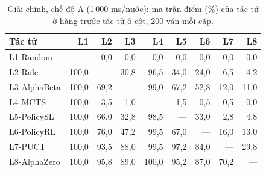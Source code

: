 \begin{table}[H]
  \centering\footnotesize
  \caption{Giải chính, chế độ A (1\,000 ms/nước): ma trận điểm (\%) của tác tử ở hàng trước tác tử ở cột, 200 ván mỗi cặp.}
  \label{tab:giai-a-matran}
  \setlength{\tabcolsep}{4pt}
  \begin{tabular}{@{}lrrrrrrrr@{}}
    \toprule
    Tác tử & L1 & L2 & L3 & L4 & L5 & L6 & L7 & L8 \\
    \midrule
    L1-Random & --- & 0{,}0 & 0{,}0 & 0{,}0 & 0{,}0 & 0{,}0 & 0{,}0 & 0{,}0 \\
    L2-Rule & 100{,}0 & --- & 30{,}8 & 96{,}5 & 34{,}0 & 24{,}0 & 6{,}5 & 4{,}2 \\
    L3-AlphaBeta & 100{,}0 & 69{,}2 & --- & 99{,}0 & 67{,}2 & 52{,}8 & 12{,}0 & 11{,}0 \\
    L4-MCTS & 100{,}0 & 3{,}5 & 1{,}0 & --- & 1{,}5 & 0{,}5 & 0{,}5 & 0{,}0 \\
    L5-PolicySL & 100{,}0 & 66{,}0 & 32{,}8 & 98{,}5 & --- & 33{,}0 & 2{,}8 & 4{,}8 \\
    L6-PolicyRL & 100{,}0 & 76{,}0 & 47{,}2 & 99{,}5 & 67{,}0 & --- & 16{,}0 & 13{,}0 \\
    L7-PUCT & 100{,}0 & 93{,}5 & 88{,}0 & 99{,}5 & 97{,}2 & 84{,}0 & --- & 29{,}8 \\
    L8-AlphaZero & 100{,}0 & 95{,}8 & 89{,}0 & 100{,}0 & 95{,}2 & 87{,}0 & 70{,}2 & --- \\
    \bottomrule
  \end{tabular}
\end{table}
